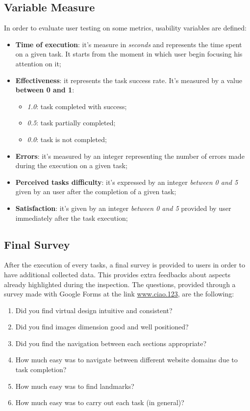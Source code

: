 \subsection{Variable Measure}
In order to evaluate user testing on some metrics, usability variables are defined:
\begin{itemize}
\item \textbf{Time of execution}: it's measure in \textit{seconds} and represents the time spent on a given task. It starts from the moment in which user begin focusing his attention on it;
\item \textbf{Effectiveness}: it represents the task success rate. It's measured by a value \textbf{between 0 and 1}:
    \begin{itemize} 
    \item \textit{1.0}: task completed with success;
    \item \textit{0.5}: task partially completed;
    \item \textit{0.0}: task is not completed;
    \end{itemize}
\item \textbf{Errors}: it's measured by an integer representing the number of errors made during the execution on a given task;
\item \textbf{Perceived tasks difficulty}: it's expressed by an integer \textit{between 0 and 5} given by an user after the completion of a given task;
\item \textbf{Satisfaction}: it's given by an integer \textit{between 0 and 5} provided by user immediately after the task execution;
\end{itemize}


\subsection{Final Survey}
After the execution of every tasks, a final survey is provided to users in order to have additional collected data. This provides extra feedbacks about aspects already highlighted during the inspection.
The questions, provided through a survey made with Google Forms at the link \url{www.ciao.123}, are the following:
\begin{enumerate}
\item Did you find virtual design intuitive and consistent?
\item Did you find images dimension good and well positioned?
\item Did you find the navigation between each sections appropriate?
\item How much easy was to navigate between different website domains due to task completion?
\item How much easy was to find landmarks?
\item How much easy was to carry out each task (in general)?
\end{enumerate}